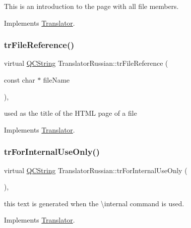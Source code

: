 This is an introduction to the page with all file members. 

Implements \mbox{\hyperlink{class_translator}{Translator}}.

\mbox{\label{class_translator_russian_a057e728e1cd5aaea934d3ecba94f13db}} 
\subsubsection{\texorpdfstring{trFileReference()}{trFileReference()}}
{\footnotesize\ttfamily virtual \mbox{\hyperlink{class_q_c_string}{Q\+C\+String}} Translator\+Russian\+::tr\+File\+Reference (\begin{DoxyParamCaption}\item[{const char $\ast$}]{file\+Name }\end{DoxyParamCaption})\hspace{0.3cm}{\ttfamily [inline]}, {\ttfamily [virtual]}}

used as the title of the H\+T\+ML page of a file 

Implements \mbox{\hyperlink{class_translator}{Translator}}.

\mbox{\label{class_translator_russian_a6379257059c0bb5d172d15afe325b372}} 
\subsubsection{\texorpdfstring{trForInternalUseOnly()}{trForInternalUseOnly()}}
{\footnotesize\ttfamily virtual \mbox{\hyperlink{class_q_c_string}{Q\+C\+String}} Translator\+Russian\+::tr\+For\+Internal\+Use\+Only (\begin{DoxyParamCaption}{ }\end{DoxyParamCaption})\hspace{0.3cm}{\ttfamily [inline]}, {\ttfamily [virtual]}}

this text is generated when the \textbackslash{}internal command is used. 

Implements \mbox{\hyperlink{class_translator}{Translator}}.

\mbox{\label{class_translator_russian_ab1d532f1a50a4645ee050f59a5163cbe}} 
